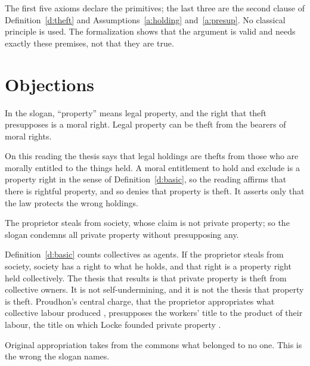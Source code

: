 \documentclass{situationist-preprint}
\begin{document}
The first five axioms declare the primitives; the last three are the second clause of Definition~\ref{d:theft} and Assumptions~\ref{a:holding} and~\ref{a:presup}. No classical principle is used. The formalization shows that the argument is valid and needs exactly these premises, not that they are true.

\section{Objections}

\begin{objection}
In the slogan, \enquote{property} means legal property, and the right that theft presupposes is a moral right. Legal property can be theft from the bearers of moral rights.
\end{objection}

\begin{reply}
On this reading the thesis says that legal holdings are thefts from those who are morally entitled to the things held. A moral entitlement to hold and exclude is a property right in the sense of Definition~\ref{d:basic}, so the reading affirms that there is rightful property, and so denies that property is theft. It asserts only that the law protects the wrong holdings.
\end{reply}

\begin{objection}
The proprietor steals from society, whose claim is not private property; so the slogan condemns all private property without presupposing any.
\end{objection}

\begin{reply}
Definition~\ref{d:basic} counts collectives as agents. If the proprietor steals from society, society has a right to what he holds, and that right is a property right held collectively. The thesis that results is that private property is theft from collective owners. It is not self-undermining, and it is not the thesis that property is theft. Proudhon's central charge, that the proprietor appropriates what collective labour produced \citep[ch.~3]{Proudhon1840}, presupposes the workers' title to the product of their labour, the title on which Locke founded private property \citep[II, ch.~V]{Locke1689}.
\end{reply}

\begin{objection}
Original appropriation takes from the commons what belonged to no one. This is the wrong the slogan names.
\end{objection}
\end{document}
